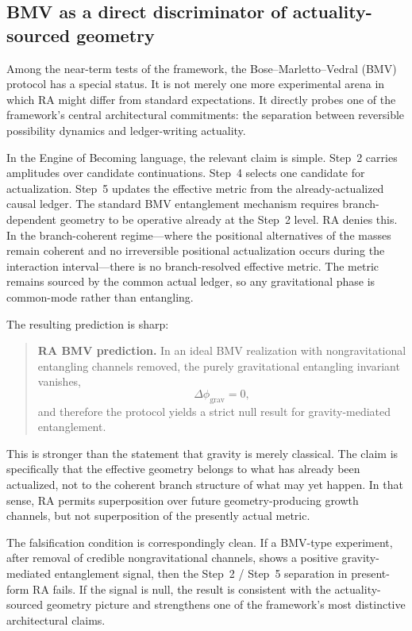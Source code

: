 \subsection{BMV as a direct discriminator of actuality-sourced geometry}

Among the near-term tests of the framework, the Bose--Marletto--Vedral (BMV) protocol has a special status. It is not merely one more experimental arena in which RA might differ from standard expectations. It directly probes one of the framework's central architectural commitments: the separation between reversible possibility dynamics and ledger-writing actuality.

In the Engine of Becoming language, the relevant claim is simple. Step~2 carries amplitudes over candidate continuations. Step~4 selects one candidate for actualization. Step~5 updates the effective metric from the already-actualized causal ledger. The standard BMV entanglement mechanism requires branch-dependent geometry to be operative already at the Step~2 level. RA denies this. In the branch-coherent regime---where the positional alternatives of the masses remain coherent and no irreversible positional actualization occurs during the interaction interval---there is no branch-resolved effective metric. The metric remains sourced by the common actual ledger, so any gravitational phase is common-mode rather than entangling.

The resulting prediction is sharp:
\begin{quote}
\textbf{RA BMV prediction.} In an ideal BMV realization with nongravitational entangling channels removed, the purely gravitational entangling invariant vanishes,
\[
\Delta \phi_{\mathrm{grav}} = 0,
\]
and therefore the protocol yields a strict null result for gravity-mediated entanglement.
\end{quote}

This is stronger than the statement that gravity is merely classical. The claim is specifically that the effective geometry belongs to what has already been actualized, not to the coherent branch structure of what may yet happen. In that sense, RA permits superposition over future geometry-producing growth channels, but not superposition of the presently actual metric.

The falsification condition is correspondingly clean. If a BMV-type experiment, after removal of credible nongravitational channels, shows a positive gravity-mediated entanglement signal, then the Step~2 / Step~5 separation in present-form RA fails. If the signal is null, the result is consistent with the actuality-sourced geometry picture and strengthens one of the framework's most distinctive architectural claims.
